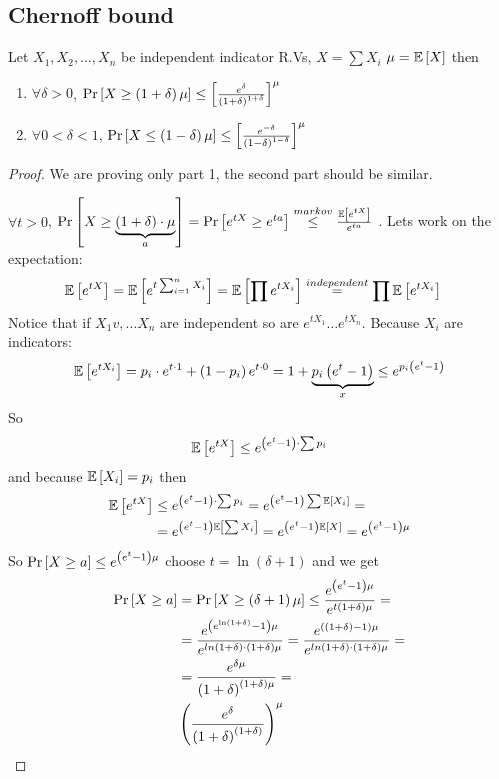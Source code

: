 \subsection{Chernoff bound}
\begin{thm}
\begin{flushleft}
 Let $X_{1},X_{2},\dots,X_{n}$ be independent indicator R.Vs, $X=\sum X_{i}$
$\mu=\mathbb{E}\left[X\right]$ then
\par\end{flushleft}
\begin{enumerate}
\item $\forall\delta>0$, $\Pr\left[X\ge\left(1+\delta\right)\mu\right]\le\left[\frac{e^{\delta}}{\left(1+\delta\right)^{1+\delta}}\right]^{\mu}$
\item $\forall0<\delta<1$, $\Pr\left[X\le\left(1-\delta\right)\mu\right]\le\left[\frac{e^{-\delta}}{\left(1-\delta\right)^{1-\delta}}\right]^{\mu}$
\end{enumerate}
\begin{proof}
We are proving only part 1, the second part should be similar. 

$\forall t>0$, $\Pr\left[X\ge\underbrace{\left(1+\delta\right)\cdot\mu}_{a}\right]=\Pr\left[e^{tX}\ge e^{ta}\right]\overset{markov}{\le}\frac{\mathbb{E}\left[e^{tX}\right]}{e^{ta}}$
. Lets work on the expectation:
\begin{align*}
\mathbb{E}\left[e^{tX}\right] & =\mathbb{E}\left[e^{t\sum_{i=1}^{n}X_{i}}\right]=\mathbb{E}\left[\prod e^{tX_{i}}\right]\overset{independent}{=}\prod\mathbb{E}\left[e^{tX_{i}}\right]
\end{align*}
Notice that if $X_{1}v,\dots X_{n}$ are independent so are $e^{tX_{1}}\dots e^{tX_{n}}$.
Because $X_{i}$ are indicators:
\[
\mathbb{E}\left[e^{tX_{i}}\right]=p_{i}\cdot e^{t\cdot1}+\left(1-p_{i}\right)e^{t\cdot0}=1+\underbrace{p_{i}\left(e^{t}-1\right)}_{x}\le e^{p_{i}\left(e^{t}-1\right)}
\]
 So 
\[
\mathbb{E}\left[e^{tX}\right]\le e^{\left(e^{t}-1\right)\cdot\sum p_{i}}
\]
 and because $\mathbb{E}\left[X_{i}\right]=p_{i}$ then 
\begin{align*}
\mathbb{E}\left[e^{tX}\right] & \le e^{\left(e^{t}-1\right)\cdot\sum p_{i}}=e^{\left(e^{t}-1\right)\sum\mathbb{E}\left[X_{i}\right]}=\\
 & =e^{\left(e^{t}-1\right)\mathbb{E}\left[\sum X_{i}\right]}=e^{\left(e^{t}-1\right)\mathbb{E}\left[X\right]}=e^{\left(e^{t}-1\right)\mu}
\end{align*}
 So $\Pr\left[X\ge a\right]\le e^{\left(e^{t}-1\right)\mu}$ choose $t=\ln\left(\delta+1\right)$
and we get
\begin{align*}
\Pr\left[X\ge a\right] & =\Pr\left[X\ge\left(\delta+1\right)\mu\right]\le\frac{e^{\left(e^{t}-1\right)\mu}}{e^{t\left(1+\delta\right)\mu}}=\\
 & =\frac{e^{\left(e^{\ln\left(1+\delta\right)}-1\right)\mu}}{e^{ln\left(1+\delta\right)\cdot\left(1+\delta\right)\mu}}=\frac{e^{\left(\left(1+\delta\right)-1\right)\mu}}{e^{ln\left(1+\delta\right)\cdot\left(1+\delta\right)\mu}}=\\
 & =\frac{e^{\delta\mu}}{\left(1+\delta\right)^{\left(1+\delta\right)\mu}}=\\
 & \left(\frac{e^{\delta}}{\left(1+\delta\right)^{\left(1+\delta\right)}}\right)^{\mu}
\end{align*}
\end{proof}
\end{thm}


